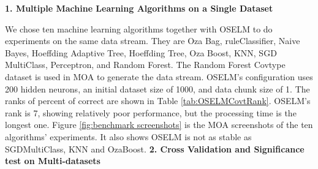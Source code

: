 \documentclass[a4paper, 14pt]{extarticle}
\begin{document}
\par\textbf{1. Multiple Machine Learning Algorithms on a Single Dataset}
\newline
\par We chose ten machine learning algorithms together with OSELM to do experiments on the same data stream. They are Oza Bag, ruleClassifier, Naive Bayes, Hoeffding Adaptive Tree, Hoeffding Tree, Oza Boost, KNN, SGD MultiClass, Perceptron, and Random Forest. The Random Forest Covtype dataset is used in MOA to generate the data stream. OSELM's configuration uses 200 hidden neurons, an initial dataset size of 1000, and data chunk size of 1. The ranks of percent of correct are shown in Table \ref{tab:OSELMCovtRank}. OSELM's rank is 7, showing relatively poor performance, but the processing time is the longest one. Figure \ref{fig:benchmark screenshots} is the MOA screenshots of the ten algorithms' experiments.  It also shows OSELM is not as stable as SGDMultiClass, KNN and OzaBoost.
\newline
\newline
\textbf{2. Cross Validation and Significance test on Multi-datasets}
\newline
\end{document}
